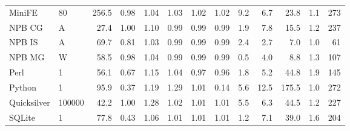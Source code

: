 \begin{tabular}{llrrrrrrrrrrr}
MiniFE & 80 & 256.5 & 0.98 & 1.04 & 1.03 & 1.02 & 1.02 & 9.2 & 6.7 & 23.8 & 1.1 & 273 \\
NPB CG & A & 27.4 & 1.00 & 1.10 & 0.99 & 0.99 & 0.99 & 1.9 & 7.8 & 15.5 & 1.2 & 237 \\
NPB IS & A & 69.7 & 0.81 & 1.03 & 0.99 & 0.99 & 0.99 & 2.4 & 2.7 & 7.0 & 1.0 & 61 \\
NPB MG & W & 58.5 & 0.98 & 1.04 & 0.99 & 0.99 & 0.99 & 0.5 & 4.0 & 8.8 & 1.3 & 107 \\
Perl & 1 & 56.1 & 0.67 & 1.15 & 1.04 & 0.97 & 0.96 & 1.8 & 5.2 & 44.8 & 1.9 & 145 \\
Python & 1 & 95.9 & 0.37 & 1.19 & 1.29 & 1.01 & 0.14 & 5.6 & 12.5 & 175.5 & 1.0 & 272 \\
Quicksilver & 100000 & 42.2 & 1.00 & 1.28 & 1.02 & 1.01 & 1.01 & 5.5 & 6.3 & 44.5 & 1.2 & 227 \\
SQLite & 1 & 77.8 & 0.43 & 1.06 & 1.01 & 1.01 & 1.01 & 1.2 & 7.1 & 39.0 & 1.6 & 204 \\
\bottomrule
\end{tabular}
